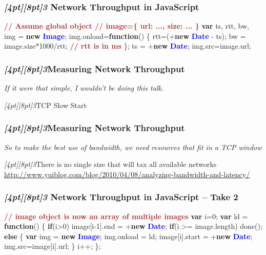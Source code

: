 \documentclass{beamer}
\newcommand{\sn}[1]{\textrm{\textit{\Huge{\raisebox{-3pt}[4pt][8pt]{\textcolor{f2elblue}{#1}}}}}\hspace{4pt}}
\newcommand{\innersplash}[1]{
  \begin{center}
    \large \textrm{\textit{ #1 } }
  \end{center}
}
\newcommand{\splashslide}[2][{}]{
  \begin{frame}
  \frametitle{#1}
  \innersplash{#2}
  \end{frame}
}
\def\brown<#1>#2{\textcolor<#1>{brown}{\textbf<#1>{#2}}}
\def\green<#1>#2{\textcolor<#1>{dark-green}{\textbf<#1>{#2}}}
\def\blue<#1>#2{\textcolor<#1>{blue}{\textbf<#1>{#2}}}
\begin{document}
\begin{frame}[fragile]
\frametitle{\sn{3} Network Throughput in JavaScript}
\begin{semiverbatim}
\brown<1>{// Assume global object
// image=\{ url: ..., size: ... \}}
\green<1>{var} ts, rtt, bw, img = \green<1>{new} \blue<1>{Image};
img.onload=\green<1>{function}() \{
   rtt=(+\green<1>{new} \blue<1>{Date} - ts);
   bw = image.size*1000/rtt;    \brown<1>{// rtt is in ms}
\};
ts = +\green<1>{new} \blue<1>{Date};
img.src=image.url;
\end{semiverbatim}
\end{frame}

\splashslide[\sn{3}Measuring Network Throughput]{If it were that simple, I wouldn't be doing this talk.}

\begin{frame}{\sn{3}TCP Slow Start}
\end{frame}

\splashslide[\sn{3}Measuring Network Throughput]{So to make the best use of bandwidth, we need resources that fit in a TCP window}

\begin{frame}{\sn{3}There is no single size that will tax all available networks }
\vspace{6cm}
\tiny \href{http://www.yuiblog.com/blog/2010/04/08/analyzing-bandwidth-and-latency/}{http://www.yuiblog.com/blog/2010/04/08/analyzing-bandwidth-and-latency/}
\end{frame}

\begin{frame}[fragile]
\frametitle{\sn{3} Network Throughput in JavaScript -- Take 2}
\begin{semiverbatim}
\brown<1>{// image object is now an array of multiple images}
\green<1>{var} i=0;
\green<1>{var} ld = \green<1>{function}() \{
   \green<1>{if}(i>0)
      image[i-1].end = +\green<1>{new} \blue<1>{Date};
   \green<1>{if}(i >= image.length)
      done();
   \green<1>{else} \{
      \green<1>{var} img = \green<1>{new} \blue<1>{Image};
      img.onload = ld;
      image[i].start = +\green<1>{new} \blue<1>{Date};
      img.src=image[i].url;
   \}
   i++;
\};
\end{semiverbatim}
\end{frame}
\end{document}

